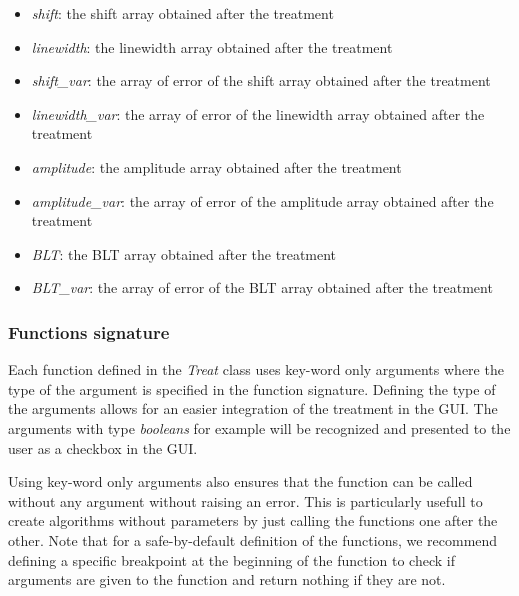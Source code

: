 \begin{itemize}
    \item \textit{shift}: the shift array obtained after the treatment
    \item \textit{linewidth}: the linewidth array obtained after the treatment
    \item \textit{shift\_var}: the array of error of the shift array obtained after the treatment
    \item \textit{linewidth\_var}: the array of error of the linewidth array obtained after the treatment
    \item \textit{amplitude}: the amplitude array obtained after the treatment
    \item \textit{amplitude\_var}: the array of error of the amplitude array obtained after the treatment
    \item \textit{BLT}: the BLT array obtained after the treatment
    \item \textit{BLT\_var}: the array of error of the BLT array obtained after the treatment
\end{itemize}

\subsubsection{Functions signature}

Each function defined in the \textit{Treat} class uses key-word only arguments where the type of the argument is specified in the function signature. Defining the type of the arguments allows for an easier integration of the treatment in the GUI. The arguments with type \textit{booleans} for example will be recognized and presented to the user as a checkbox in the GUI.

Using key-word only arguments also ensures that the function can be called without any argument without raising an error. This is particularly usefull to create algorithms without parameters by just calling the functions one after the other. Note that for a safe-by-default definition of the functions, we recommend defining a specific breakpoint at the beginning of the function to check if arguments are given to the function and return nothing if they are not.

